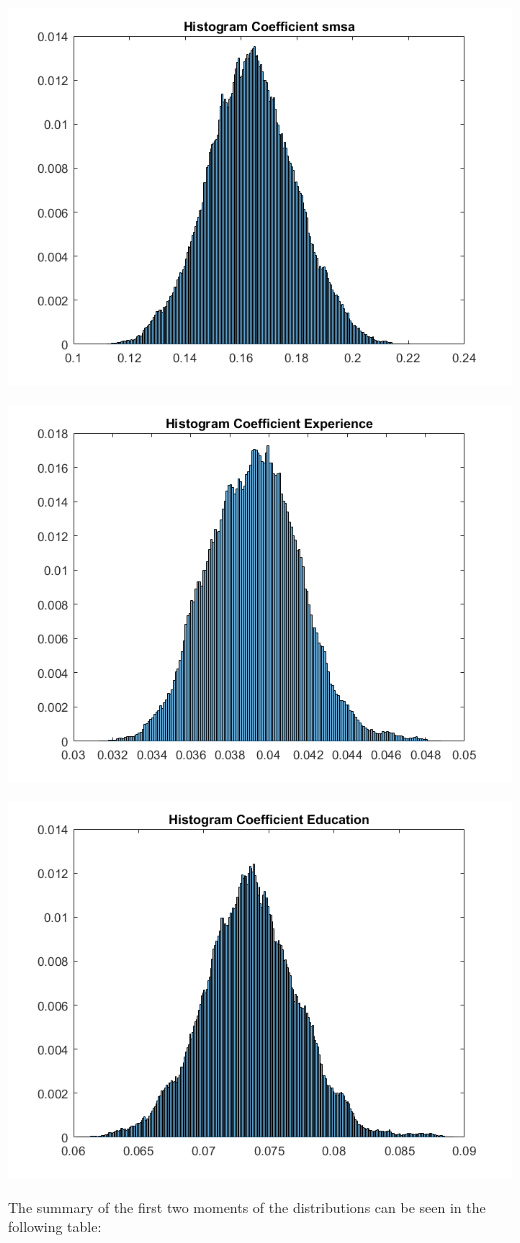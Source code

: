\documentclass[12pt]{article}%
\begin{document}
\begin{enumerate}
\begin{center}
	\end{center}
	\begin{center}
		\includegraphics[width=0.7\linewidth]{sms1}
	\end{center}
	\begin{center}
		\includegraphics[width=0.7\linewidth]{Exper1}
	\end{center}
	\begin{center}
		\includegraphics[width=0.7\linewidth]{Education1}
	\end{center}

The summary of the first two moments of the distributions can be seen in the following table:


\end{enumerate}
\end{document}
